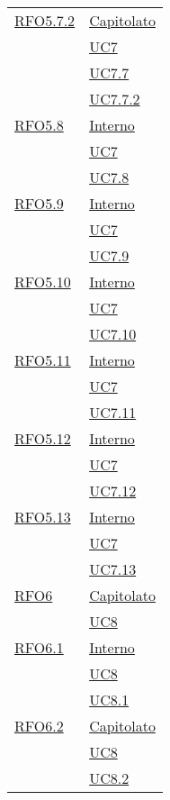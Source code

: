 \begin{longtable}{|>{\centering}m{5cm}|m{5cm}<{\centering}|}
\hyperlink{RFO5.7.2}{RFO5.7.2} 
& \hyperlink{Capitolato}{Capitolato}\\
& \hyperref[UC7]{UC7}\\
& \hyperref[UC7.7]{UC7.7}\\
& \hyperref[UC7.7.2]{UC7.7.2}\\ \hline

\hyperlink{RFO5.8}{RFO5.8} 
& \hyperlink{Interno}{Interno}\\
& \hyperref[UC7]{UC7}\\
& \hyperref[UC7.8]{UC7.8}\\
 \hline
 
 \hyperlink{RFO5.9}{RFO5.9} 
 & \hyperlink{Interno}{Interno}\\
 & \hyperref[UC7]{UC7}\\
 & \hyperref[UC7.9]{UC7.9}\\\hline
 
\hyperlink{RFO5.10}{RFO5.10} 
& \hyperlink{Interno}{Interno}\\
 & \hyperref[UC7]{UC7}\\
 & \hyperref[UC7.10]{UC7.10}\\\hline
 
 \hyperlink{RFD5.11}{RFO5.11} 
& \hyperlink{Interno}{Interno}\\
 & \hyperref[UC7]{UC7}\\
 & \hyperref[UC7.11]{UC7.11}\\\hline
 
\hyperlink{RFO5.12}{RFO5.12} 
& \hyperlink{Interno}{Interno}\\
 & \hyperref[UC7]{UC7}\\
 & \hyperref[UC7.12]{UC7.12}\\\hline
 
 \hyperlink{RFO5.13}{RFO5.13} 
& \hyperlink{Interno}{Interno}\\
 & \hyperref[UC7]{UC7}\\
 & \hyperref[UC7.13]{UC7.13}\\\hline 
 
 \hyperlink{RFO6}{RFO6} 
 & \hyperlink{Capitolato}{Capitolato}\\
 & \hyperref[UC8]{UC8}\\\hline
 
 \hyperlink{RFO6.1}{RFO6.1} 
 & \hyperlink{Interno}{Interno}\\
 & \hyperref[UC8]{UC8}\\
 & \hyperref[UC8.1]{UC8.1}\\\hline
 
 \hyperlink{RFO6.2}{RFO6.2} 
 & \hyperlink{Capitolato}{Capitolato}\\
 & \hyperref[UC8]{UC8}\\
 & \hyperref[UC8.2]{UC8.2}\\\hline
 

\end{longtable}
